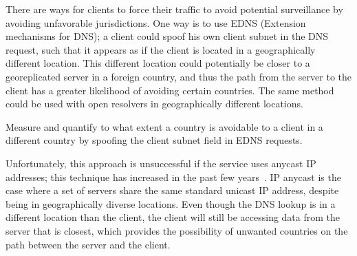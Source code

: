 There are ways for clients to force their traffic to avoid potential surveillance by avoiding unfavorable jurisdictions.  One way is to use EDNS (Extension mechanisms for DNS); a client could spoof his own client subnet in the DNS request, such that it appears as if the client is located in a geographically different location.  This different location could potentially be closer to a georeplicated server in a foreign country, and thus the path from the server to the client has a greater likelihood of avoiding certain countries.  The same method could be used with open resolvers in geographically different locations.

\begin{thm}
Measure and quantify to what extent a country is avoidable to a client in a different country by spoofing the client subnet field in EDNS requests.
\end{thm}

Unfortunately, this approach is unsuccessful if the service uses anycast IP addresses; this technique has increased in the past few years~\cite{cicalese2015characterizing}.  IP anycast is the case where a set of servers share the same standard unicast IP address, despite being in geographically diverse locations.  Even though the DNS lookup is in a different location than the client, the client will still be accessing data from the server that is closest, which provides the possibility of unwanted countries on the path between the server and the client.  


